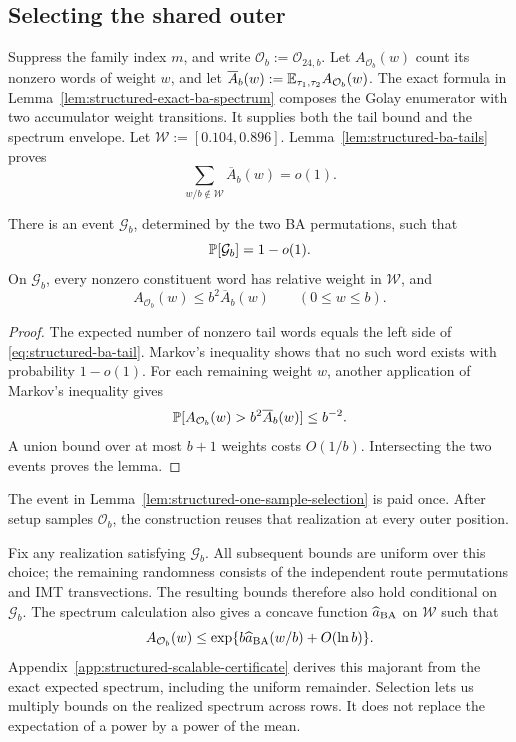 \subsection{Selecting the shared outer}

Suppress the family index $m$, and write $\mathcal O_b:=\mathcal O_{24,b}$.
Let $A_{\mathcal O_b}(w)$ count its nonzero words of weight $w$, and let
$\overline A_b(w):=\mathbb E_{\tau_1,\tau_2}A_{\mathcal O_b}(w)$.
The exact formula in Lemma~\ref{lem:structured-exact-ba-spectrum} composes
the Golay enumerator with two accumulator weight transitions.
It supplies both the tail bound and the spectrum envelope.
Let $\mathcal W:=[0.104,0.896]$. Lemma~\ref{lem:structured-ba-tails}
proves
\begin{equation}
  \sum_{w/b\notin\mathcal W}\overline A_b(w)=o(1).
  \label{eq:structured-ba-tail}
\end{equation}

\begin{lemma}
\label{lem:structured-one-sample-selection}
There is an event $\mathcal G_b$, determined by the two BA permutations, such
that
\begin{equation}
  \mathbb P[\mathcal G_b]=1-o(1).
  \label{eq:ba-good-event}
\end{equation}
On $\mathcal G_b$, every nonzero constituent word has relative weight in
$\mathcal W$, and
\begin{equation}
  A_{\mathcal O_b}(w)
  \le b^2\overline A_b(w)
  \qquad(0\le w\le b).
  \label{eq:ba-selected-spectrum}
\end{equation}
\end{lemma}

\begin{proof}
The expected number of nonzero tail words equals the left side of
\eqref{eq:structured-ba-tail}. Markov's inequality shows that no such word
exists with probability $1-o(1)$. For each remaining weight $w$, another
application of Markov's inequality gives
\[
  \mathbb P[A_{\mathcal O_b}(w)>b^2\overline A_b(w)]\le b^{-2}.
\]
A union bound over at most $b+1$ weights costs $O(1/b)$. Intersecting the two
events proves the lemma.
\end{proof}

The event in Lemma~\ref{lem:structured-one-sample-selection} is paid once.
After setup samples $\mathcal O_b$, the construction reuses that realization
at every outer position.

Fix any realization satisfying $\mathcal G_b$. All subsequent bounds are
uniform over this choice; the remaining randomness consists of the
independent route permutations and IMT transvections.
The resulting bounds therefore also hold conditional on $\mathcal G_b$.
The spectrum calculation also gives a concave function
$\widehat a_{\rm BA}$ on $\mathcal W$ such that
\[
 A_{\mathcal O_b}(w)
 \le \exp\{b\widehat a_{\rm BA}(w/b)+O(\ln b)\}.
\]
Appendix~\ref{app:structured-scalable-certificate} derives this majorant
from the exact expected spectrum, including the uniform remainder.
Selection lets us multiply bounds on the realized spectrum across rows.
It does not replace the expectation of a power by a power of the mean.

